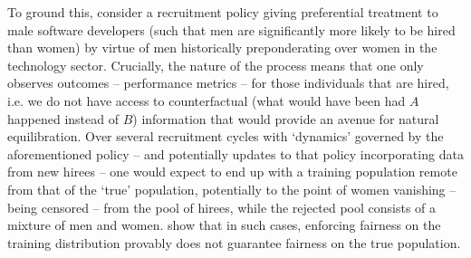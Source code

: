 %
To ground this, consider a recruitment policy giving preferential treatment to male software
developers (such that men are significantly more likely to be hired than women) by virtue of men
historically preponderating over women in the technology sector.
%
Crucially, the nature of the process means that one only observes outcomes -- performance metrics
-- for those individuals that are hired, i.e. we do not have access to counterfactual (what would
have been had \(A\) happened instead of \(B\)) information that would provide an avenue for natural
equilibration.
%
Over several recruitment cycles with `dynamics' governed by the aforementioned policy -- and
potentially updates to that policy incorporating data from new hirees -- one would expect to end up
with a training population remote from that of the `true' population, potentially to the point of
women vanishing -- being censored -- from the pool of hirees, while the rejected pool consists of a
mixture of men and women.
%
\cite{kallus2018residual} show that in such cases, enforcing fairness on the training distribution
provably does not guarantee fairness on the true population.





